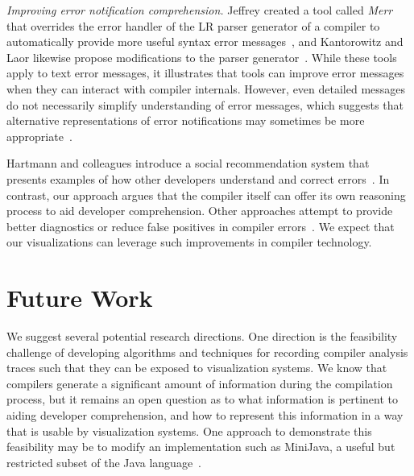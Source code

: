 \documentclass[conference]{IEEEtran}
\begin{document}
\textit{Improving error notification comprehension.} Jeffrey created a tool called \textit{Merr} that overrides the error handler of the LR parser generator of a compiler to automatically provide more useful syntax error messages~\cite{Jeffery2003}, and Kantorowitz and Laor likewise propose modifications to the parser generator~\cite{Kantorowitz1986}. While these tools apply to text error messages, it illustrates that tools can improve error messages when they can interact with compiler internals. However, even detailed messages do not necessarily simplify understanding of error messages, which suggests that alternative representations of error notifications may sometimes be more appropriate~\cite{Nienaltowski2008,Denny2014}. 

Hartmann and colleagues introduce a social recommendation system that presents examples of how other developers understand and correct errors~\cite{Hartmann2010}. In contrast, our approach argues that the compiler itself can offer its own reasoning process to aid developer comprehension. Other approaches attempt to provide better diagnostics or reduce false positives in compiler errors~\cite{Boustani2011,Campbell2014}. We expect that our visualizations can leverage such improvements in compiler technology. 




\section{Future Work}

We suggest several potential research directions. One direction is the feasibility challenge of developing algorithms and techniques for recording compiler analysis traces such that they can be exposed to visualization systems. We know that compilers generate a significant amount of information during the compilation process, but it remains an open question as to what information is pertinent to aiding developer comprehension, and how to represent this information in a way that is usable by visualization systems. One approach to demonstrate this feasibility may be to modify an implementation such as MiniJava, a useful but restricted subset of the Java language~\cite{Roberts2001}.
\end{document}
